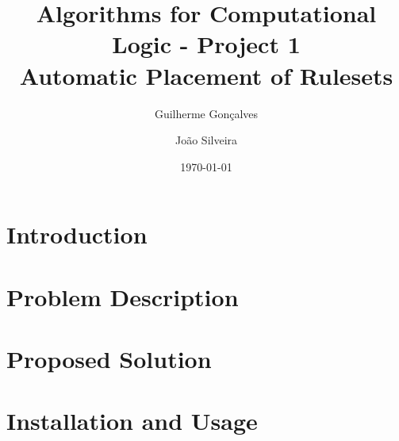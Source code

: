 \documentclass[a4paper, 11pt]{article}
\title{Algorithms for Computational Logic - Project 1 \\ \textbf{Automatic Placement of Rulesets}}
\author{Guilherme Gonçalves \and João Silveira}
\date{\today}
\begin{document}
\maketitle

\clearpage
\tableofcontents
\clearpage

\section{Introduction}


\section{Problem Description}


\section{Proposed Solution}


\section{Installation and Usage}



% 
\end{document}
